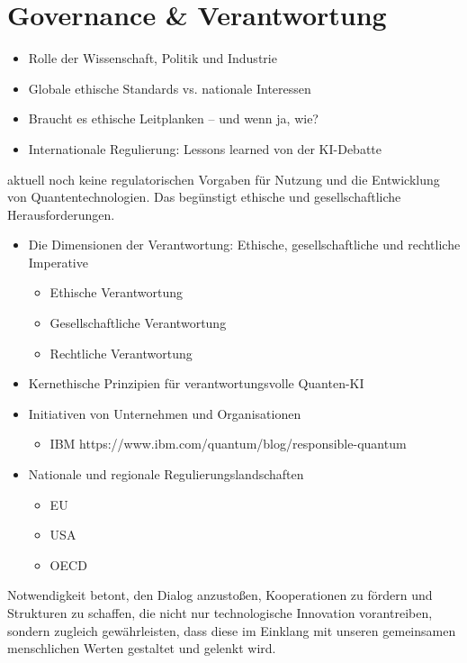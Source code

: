 \cite{umbrello_quantum_2024}

\section{Governance \& Verantwortung}
\begin{itemize}
\item Rolle der Wissenschaft, Politik und Industrie
\item Globale ethische Standards vs. nationale Interessen
\item Braucht es ethische Leitplanken – und wenn ja, wie?
\item Internationale Regulierung: Lessons learned von der KI-Debatte
\end{itemize}


    aktuell noch keine regulatorischen Vorgaben für Nutzung und die Entwicklung von Quantentechnologien. Das begünstigt ethische und gesellschaftliche Herausforderungen. \cite{umbrello_quantum_2024} \cite{1-s2.0-S0370157324001078}
\begin{itemize}
    \item Die Dimensionen der Verantwortung: Ethische, gesellschaftliche und rechtliche Imperative
    \begin{itemize}
        \item Ethische Verantwortung
        \item Gesellschaftliche Verantwortung
        \item Rechtliche Verantwortung
    \end{itemize}
\item Kernethische Prinzipien für verantwortungsvolle Quanten-KI
\item Initiativen von Unternehmen und Organisationen
\begin{itemize}
    \item IBM https://www.ibm.com/quantum/blog/responsible-quantum
\end{itemize}
\item Nationale und regionale Regulierungslandschaften
\begin{itemize}
    \item EU
    \item USA
    \item OECD
\end{itemize}
\end{itemize}
    Notwendigkeit betont, den Dialog anzustoßen, Kooperationen zu fördern und Strukturen zu schaffen, die nicht nur technologische Innovation vorantreiben, sondern zugleich gewährleisten, dass diese im Einklang mit unseren gemeinsamen menschlichen Werten gestaltet und gelenkt wird. \cite{umbrello_quantum_2024}
